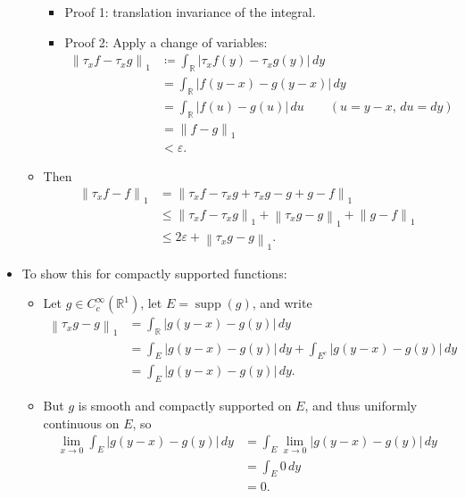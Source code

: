 \begin{solution}
\begin{itemize}
\begin{itemize}
    \begin{itemize}
    \tightlist
    \item
      Proof 1: translation invariance of the integral.
    \item
      Proof 2: Apply a change of variables:
      \begin{align*}  
      {\left\lVert {\tau_x f - \tau_x g} \right\rVert}_1
      &\coloneqq\int_{\mathbb{R}}{\left\lvert {\tau_x f(y) - \tau_x g(y)} \right\rvert}\, dy \\
      &= \int_{\mathbb{R}}{\left\lvert {f(y-x) - g(y-x)} \right\rvert}\, dy  \\
      &= \int_{\mathbb{R}}{\left\lvert {f(u) - g(u)} \right\rvert}\, du \qquad (u=y-x,\, du=dy) \\
      &= {\left\lVert {f-g} \right\rVert}_1 \\
      &< \varepsilon
      .\end{align*}
    \end{itemize}
  \item
    Then
    \begin{align*}  
    {\left\lVert {\tau_x f - f} \right\rVert}_1 
    &= {\left\lVert {\tau_x f - \tau_x g + \tau_x g - g +g - f} \right\rVert}_{1} \\
    &\leq {\left\lVert {\tau_x f - \tau_x g} \right\rVert}_1 + {\left\lVert {\tau_x g - g} \right\rVert}_1 + {\left\lVert {g - f} \right\rVert}_{1} \\
    &\leq 2\varepsilon+ {\left\lVert {\tau_x g - g} \right\rVert}_1
    .\end{align*}
  \end{itemize}
\item
  To show this for compactly supported functions:

  \begin{itemize}
  \item
    Let \(g\in C_c^\infty({\mathbb{R}}^1)\), let
    \(E = {\operatorname{supp}}(g)\), and write
    \begin{align*}  
    {\left\lVert {\tau_x g - g} \right\rVert}_1 
    &= \int_{\mathbb{R}}{\left\lvert {g(y-x) - g(y)} \right\rvert}\,dy \\
    &= \int_E {\left\lvert {g(y-x) - g(y)} \right\rvert} \,dy + \int_{E^c} {\left\lvert {g(y-x) - g(y)} \right\rvert} \,dy\\
    &= \int_E {\left\lvert {g(y-x) - g(y)} \right\rvert} \,dy 
    .\end{align*}
  \item
    But \(g\) is smooth and compactly supported on \(E\), and thus
    uniformly continuous on \(E\), so
    \begin{align*}  
    \lim_{x\to 0} \int_E {\left\lvert {g(y-x) - g(y)} \right\rvert} \,dy 
    &= \int_E \lim_{x\to 0} {\left\lvert {g(y-x) - g(y)} \right\rvert} \,dy \\
    &= \int_E 0 \,dy \\
    &= 0
    .\end{align*}
  \end{itemize}
\end{itemize}

\end{solution}

